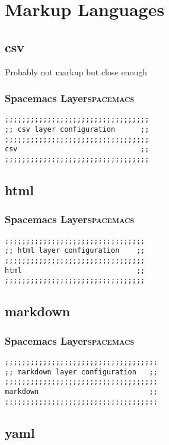 \documentclass[11pt]{article}
\begin{document}
\section{Markup Languages}
\label{sec:orgf21433b}
\subsection{csv}
\label{sec:orgfd74811}
Probably not markup but close enough
\subsubsection{Spacemacs Layer\hfill{}\textsc{spacemacs}}
\label{sec:orgda6688d}
\begin{verbatim}
;;;;;;;;;;;;;;;;;;;;;;;;;;;;;;;;;;
;; csv layer configuration      ;;
;;;;;;;;;;;;;;;;;;;;;;;;;;;;;;;;;;
csv                             ;;
;;;;;;;;;;;;;;;;;;;;;;;;;;;;;;;;;;
\end{verbatim}

\subsection{html}
\label{sec:org14e1247}
\subsubsection{Spacemacs Layer\hfill{}\textsc{spacemacs}}
\label{sec:org44f339b}
\begin{verbatim}
;;;;;;;;;;;;;;;;;;;;;;;;;;;;;;;;;
;; html layer configuration    ;;
;;;;;;;;;;;;;;;;;;;;;;;;;;;;;;;;;
html                           ;;
;;;;;;;;;;;;;;;;;;;;;;;;;;;;;;;;;
\end{verbatim}

\subsection{markdown}
\label{sec:org1a6477b}
\subsubsection{Spacemacs Layer\hfill{}\textsc{spacemacs}}
\label{sec:orgd8b3f15}
\begin{verbatim}
;;;;;;;;;;;;;;;;;;;;;;;;;;;;;;;;;;;;
;; markdown layer configuration   ;;
;;;;;;;;;;;;;;;;;;;;;;;;;;;;;;;;;;;;
markdown                          ;;
;;;;;;;;;;;;;;;;;;;;;;;;;;;;;;;;;;;;
\end{verbatim}

\subsection{yaml}
\label{sec:org608c20b}
\end{document}
